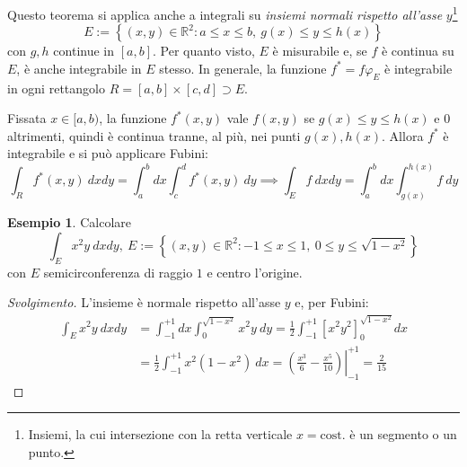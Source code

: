 \documentclass[11pt, a4paper]{scrartcl}
\newenvironment{svolgimento}{\renewcommand\qedsymbol{$\blacksquare$}\begin{proof}[Svolgimento]}{\end{proof}}
\theoremstyle{definition}
\newtheorem{esempio}{Esempio}
\numberwithin{esempio}{section}
\theoremstyle{definition}
\numberwithin{obs}{section}
\numberwithin{nota}{section}
\newcommand*\Eval[3]{\left.#1\right\rvert_{#2}^{#3}}
\numberwithin{equation}{subsection}
\begin{document}
\noindent Questo teorema si applica anche a integrali su \textit{insiemi normali rispetto all'asse} $y$\footnote{Insiemi, la cui intersezione con la retta verticale $x=\text{cost.}$ \`e un segmento o un punto.}
\[
E := \left\{ (x,y) \in \mathbb{R}^2 : a\le x\le b , \ g(x) \le  y \le h(x) \right\} 
\] 
con $g,h$ continue in $[a,b]$. Per quanto visto, $E$ \`e misurabile e, se $f$ \`e continua su $E$, \`e anche integrabile in $E$ stesso. 
In generale, la funzione $f^* = f \varphi _E$ \`e integrabile in ogni rettangolo $R = [a,b] \times  [c,d] \supset E$.

Fissata $x \in [a,b)$, la funzione $f^*(x,y)$ vale $f(x,y)$ se $g(x) \le  y \le h(x)$ e $0$ altrimenti, quindi \`e continua tranne, al pi\`u, nei punti $g(x), h(x)$. Allora $f^*$ \`e integrabile e si pu\`o applicare Fubini:
\[
	\int_{R} f^*(x,y) \ dxdy = \int_{a} ^b dx \int_{c} ^d f^*(x,y) \ dy \implies \int_{E} f \ dxdy = \int_{a} ^b dx \int_{g(x)} ^{h(x)} f \ dy
\] 
\begin{esempio}
Calcolare
\[
\int_{E} x^2 y \ dxdy, \ E := \left\{ (x,y) \in \mathbb{R}^2:-1\le x\le 1 , \ 0 \le  y \le  \sqrt{1-x^2}  \right\} 
\] 
con $E$ semicirconferenza di raggio $1$ e centro l'origine.
\begin{svolgimento}
	L'insieme \`e normale rispetto all'asse $y$ e, per Fubini:
	\[
	\begin{split}
		\int_E x^2  y \ dxdy &= \int_{-1} ^{+1} dx \int_{0} ^{\sqrt{1-x^2} } x^2 y \ dy = \frac{1}{2}\int_{-1} ^{+1} \left[ x^2 y^2 \right] _{0} ^{\sqrt{1-x^2} }  dx\\
				     &= \frac{1}{2}\int_{-1} ^{+1} x ^2 (1-x^2) \ dx = \Eval{\left(\frac{x^3}{6}- \frac{x^5}{10}\right) }{-1}{+1} = \frac{2}{15}
	\end{split}
	\] 
	
\end{svolgimento}
\end{esempio}
\end{document}
